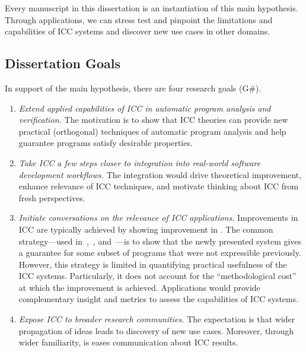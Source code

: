 \noindent
Every manuscript in this dissertation is an instantiation of this main hypothesis.
Through applications, we can stress test and pinpoint the limitations and
capabilities of ICC systems and discover new use cases in other domains.

\subsection{Dissertation Goals}\label{subsec:specific-aims}

In support of the main hypothesis, there are four research goals (G\#).

\begin{enumerate}[label={\textbf{G\arabic*.}}]

\item\emph{Extend applied capabilities of ICC in automatic program analysis and verification.}
The motivation is to show that ICC theories can provide new practical (orthogonal) techniques of automatic program analysis and help guarantee programs satisfy desirable properties.

\item\emph{Take ICC a few steps closer to integration into real-world software development workflows.}
The integration would drive theoretical improvement, enhance relevance of ICC techniques, and motivate thinking about ICC from fresh perspectives.

\item \emph{Initiate conversations on the relevance of ICC applications.}
Improvements in ICC are typically achieved by showing improvement in .
The common strategy---used \eg in~\cite[p.16--17]{hainry2023},~\cite[p. 17]{jones2009}, and~\cite[p. 147]{feree2018}---is to show that the newly presented system gives a guarantee for some subset of programs that were not expressible previously.
However, this strategy is limited in quantifying practical usefulness of the ICC systems.
Particularly, it does not account for the \enquote{methodological cost} at which the improvement is achieved.
Applications would provide complementary insight and metrics to assess the capabilities of ICC systems.

\item \emph{Expose ICC to broader research communities.}
The expectation is that wider propagation of ideas leads to discovery of new use cases.
Moreover, through wider familiarity, is eases communication about ICC results.

\end{enumerate}


